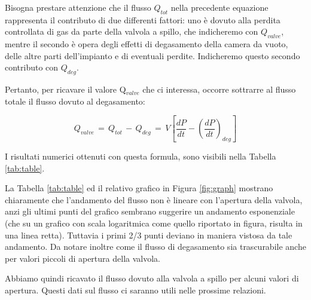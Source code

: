 Bisogna prestare attenzione che il flusso $Q_{tot}$ nella precedente equazione rappresenta il contributo di due differenti fattori: uno è dovuto alla perdita controllata di gas da parte della valvola a spillo, che indicheremo con $Q_{valve}$, mentre il secondo è opera degli effetti di degasamento della camera da vuoto, delle altre parti dell'impianto e di eventuali perdite. Indicheremo questo secondo contributo con $Q_{deg}$.

Pertanto, per ricavare il valore Q$_{valve}$ che ci interessa, occorre sottrarre al flusso totale il flusso dovuto al degasamento:

\begin{equation}
	Q_{valve} \, = \, Q_{tot} \, - \, Q_{deg} \, = \, V \left[ \frac{dP}{dt} - \left(\frac{dP}{dt}\right)_{deg} \right]
\end{equation}

I risultati numerici ottenuti con questa formula, sono visibili nella Tabella \ref{tab:table}.



La Tabella \ref{tab:table} ed il relativo grafico in Figura \ref{fig:graph} mostrano chiaramente che l'andamento del flusso non è lineare con
l'apertura della valvola, anzi gli ultimi punti del grafico sembrano suggerire un andamento esponenziale (che su un grafico
con scala logaritmica come quello riportato in figura, risulta in una linea retta). Tuttavia i primi 2/3
punti deviano in maniera vistosa da tale andamento. Da notare inoltre come il flusso di degasamento sia trascurabile
anche per valori piccoli di apertura della valvola.

Abbiamo quindi ricavato il flusso dovuto alla valvola a spillo per alcuni valori di apertura. Questi dati sul flusso ci saranno utili nelle prossime relazioni.
